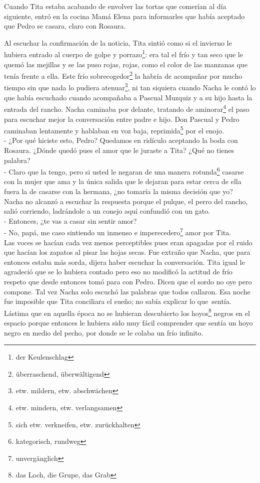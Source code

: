 Cuando Tita estaba acabando de envolver las tortas que comerían al día
siguiente, entró en la cocina Mamá Elena para informarles que había
aceptado que Pedro se casara, claro con Rosaura.

Al escuchar la confirmación de la noticia, Tita sintió como si el
invierno le hubiera entrado al cuerpo de golpe y porrazo\footnote{der Keulenschlag}: era tal el frío y tan
seco que le quemó las mejillas y se las puso rojas, rojas, como el
color de las manzanas que tenía frente a ella. Este frío sobrecogedor\footnote{überraschend, überwältigend} la
habría de acompañar por mucho tiempo sin que nada lo pudiera atenuar\footnote{etw. mildern, etw. abschwächen}, ni tan
siquiera cuando Nacha le contó lo que había escuchado cuando acompañaba
a Pascual Muzquiz y a su hijo hasta la entrada del rancho. Nacha caminaba
por delante, tratando de aminorar\footnote{etw. mindern, etw. verlangsamen}
el paso para escuchar mejor la conversación entre padre e hijo. Don Pascual
y Pedro caminaban lentamente y hablaban en voz baja, reprimida\footnote{sich etw. verkneifen, etw. zurückhalten} por
el enojo.
\\- ¿Por qué hiciste esto, Pedro? Quedamos en ridículo aceptando la boda %
con Rosaura. ¿Dónde quedó pues el amor que le juraste a Tita? ¿Qué no %
tienes palabra? %
\\- Claro que la tengo, pero si usted le negaran de una manera rotunda\footnote{kategorisch, rundweg} casarse con la mujer que %
ama y la única salida que le dejaran para estar cerca de ella fuera la %
de casarse con la hermana, ¿no tomaría la misma decisión que yo?\\

Nacha no alcanzó a escuchar la respuesta porque el pulque, el perro del
rancho, salió corriendo, ladrándole a un conejo aquí confundió con un
gato.
\\- Entonces, ¿te vas a casar sin sentir amor? %
\\- No, papá, me caso sintiendo un inmenso e imperecedero\footnote{unvergänglich} %
amor por Tita.\\

Las voces se hacían cada vez menos perceptibles pues eran apagadas por
el ruido que hacían los zapatos al pisar las hojas secas. Fue extraño
que Nacha, que para entonces estaba más sorda, dijera haber escuchar la
conversación. Tita igual le agradeció que se lo hubiera contado pero
eso no modificó la actitud de frío respeto que desde entonces tomó para
con Pedro. Dicen que el sordo no oye pero compone. Tal vez Nacha solo
escuchó las palabras que todos callaron. Esa noche fue imposible que
Tita conciliara el sueño; no sabía explicar lo que~sentía. Lástima
que en aquella época no se hubieran descubierto los hoyos\footnote{das Loch, die Grupe, das Grab} negros en el
espacio porque entonces le hubiera sido muy fácil comprender que sentía
un hoyo negro en medio del pecho, por donde se le colaba un frío
infinito.

